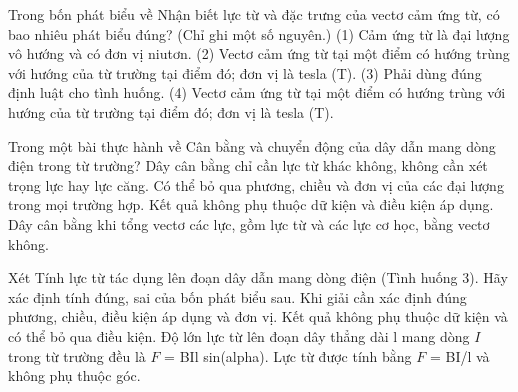 \begin{ex}
Trong bốn phát biểu về Nhận biết lực từ và đặc trưng của vectơ cảm ứng từ, có bao nhiêu phát biểu đúng? (Chỉ ghi một số nguyên.) (1) Cảm ứng từ là đại lượng vô hướng và có đơn vị niutơn. (2) Vectơ cảm ứng từ tại một điểm có hướng trùng với hướng của từ trường tại điểm đó; đơn vị là tesla (T). (3) Phải dùng đúng định luật cho tình huống. (4) Vectơ cảm ứng từ tại một điểm có hướng trùng với hướng của từ trường tại điểm đó; đơn vị là tesla (T).
\end{ex}

\begin{ex}
Trong một bài thực hành về Cân bằng và chuyển động của dây dẫn mang dòng điện trong từ trường?
\choice
{Dây cân bằng chỉ cần lực từ khác không, không cần xét trọng lực hay lực căng.}
{Có thể bỏ qua phương, chiều và đơn vị của các đại lượng trong mọi trường hợp.}
{Kết quả không phụ thuộc dữ kiện và điều kiện áp dụng.}
{\True Dây cân bằng khi tổng vectơ các lực, gồm lực từ và các lực cơ học, bằng vectơ không.}
\end{ex}

\begin{ex}
Xét Tính lực từ tác dụng lên đoạn dây dẫn mang dòng điện (Tình huống 3). Hãy xác định tính đúng, sai của bốn phát biểu sau.
\choiceTF
{\True Khi giải cần xác định đúng phương, chiều, điều kiện áp dụng và đơn vị.}
{Kết quả không phụ thuộc dữ kiện và có thể bỏ qua điều kiện.}
{\True Độ lớn lực từ lên đoạn dây thẳng dài l mang dòng $I$ trong từ trường đều là $F$ = BIl sin(alpha).}
{Lực từ được tính bằng $F$ = BI/l và không phụ thuộc góc.}
\end{ex}

